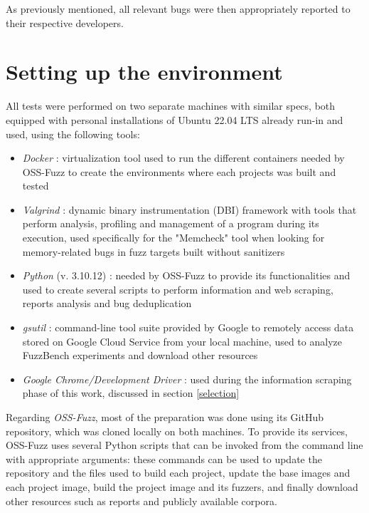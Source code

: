 As previously mentioned, all relevant bugs were then appropriately reported to their respective developers.



\newpage
\section{Setting up the environment}
All tests were performed on two separate machines with similar specs, both equipped with personal installations of Ubuntu 22.04 LTS already run-in and used, using the following tools:
\begin{itemize}
    \item \textit{Docker} \cite{Docker}: virtualization tool used to run the different containers needed by OSS-Fuzz to create the environments where each projects was built and tested
    \item \textit{Valgrind} \cite{Valgrind_1}\cite{Valgrind_2}: dynamic binary instrumentation (DBI) framework with tools that perform analysis, profiling and management of a program during its execution, used specifically for the "Memcheck" tool when looking for memory-related bugs in fuzz targets built without sanitizers
    \item \textit{Python} (v. 3.10.12) \cite{python}: needed by OSS-Fuzz to provide its functionalities and used to create several scripts to perform information and web scraping, reports analysis and bug deduplication
    \item \textit{gsutil} \cite{gsutil}: command-line tool suite provided by Google to remotely access data stored on Google Cloud Service from your local machine, used to analyze FuzzBench experiments and download other resources
    \item \textit{Google Chrome/Development Driver} \cite{driver}: used during the information scraping phase of this work, discussed in section \ref{selection}
\end{itemize}

Regarding \textit{OSS-Fuzz}, most of the preparation was done using its GitHub repository, which was cloned locally on both machines. To provide its services, OSS-Fuzz uses several Python scripts that can be invoked from the command line with appropriate arguments: these commands can be used to update the repository and the files used to build each project, update the base images and each project image, build the project image and its fuzzers, and finally download other resources such as reports and publicly available corpora. 

